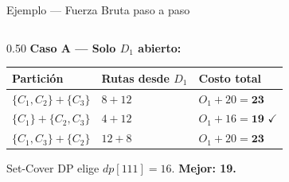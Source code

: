 \documentclass[aspectratio=169,10pt]{beamer}
\begin{document}
\begin{frame}{Ejemplo --- Fuerza Bruta paso a paso}
  \begin{columns}[T,onlytextwidth]
    \begin{column}{0.50\textwidth}
      \textbf{Caso A — Solo $D_1$ abierto:}
      \vspace{0.3em}
      \begin{center}\footnotesize
      \begin{tabular}{lll}
        \toprule
        Partición & Rutas desde $D_1$ & Costo total \\
        \midrule
        $\{C_1,C_2\}+\{C_3\}$ & $8+12$ & $O_1+20=\mathbf{23}$ \\
        $\{C_1\}+\{C_2,C_3\}$ & $4+12$ & $O_1+16=\mathbf{19}$ $\checkmark$ \\
        $\{C_1,C_3\}+\{C_2\}$ & $12+8$ & $O_1+20=\mathbf{23}$ \\
        \bottomrule
      \end{tabular}
      \end{center}
      \small Set-Cover DP elige $dp[111]=16$. \textbf{Mejor: 19.}


\end{column}
\end{columns}
\end{frame}
\end{document}
